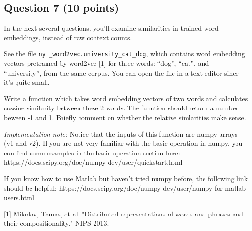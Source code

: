 \documentclass[11pt]{article}
\begin{document}
    \subsection{Question 7 (10 points)}\label{question-7-10-points}

In the next several questions, you'll examine similarities in trained
word embeddings, instead of raw context counts.

See the file \texttt{nyt\_word2vec.university\_cat\_dog}, which contains
word embedding vectors pretrained by word2vec {[}1{]} for three words:
``dog'', ``cat'', and ``university'', from the same corpus. You can open
the file in a text editor since it's quite small.

Write a function which takes word embedding vectors of two words and
calculates cossine similarity between these 2 words. The function should
return a number beween -1 and 1. Briefly comment on whether the relative
simlarities make sense.

\emph{Implementation note:} Notice that the inputs of this function are
numpy arrays (v1 and v2). If you are not very familiar with the basic
operation in numpy, you can find some examples in the basic operation
section here: https://docs.scipy.org/doc/numpy-dev/user/quickstart.html

If you know how to use Matlab but haven't tried numpy before, the
following link should be helpful:
https://docs.scipy.org/doc/numpy-dev/user/numpy-for-matlab-users.html

{[}1{]} Mikolov, Tomas, et al. "Distributed representations of words and
phrases and their compositionality." NIPS 2013.
\end{document}
